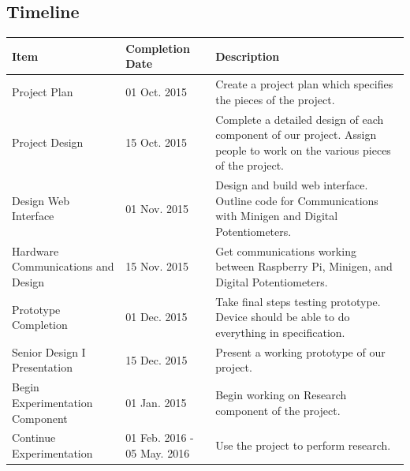 \documentclass{article}	%
\begin{document}
\subsection{Timeline}
\begin{center}
    \begin{tabularx}{\textwidth}{|X|X|X|}
        \hline
        
        \textbf{Item} & 
        \textbf{Completion Date} & 
        \textbf{Description} \\
        \hline

        Project Plan & 
        01 Oct. 2015 & 
        \multicolumn{1}{|p{12cm}|}{\centering 
        Create a project plan which specifies the pieces of the project.
        } \\
        \hline

        Project Design & 
        15 Oct. 2015 & 
        \multicolumn{1}{|p{12cm}|}{\centering 
        Complete a detailed design of each component of our project. Assign people to work on the various pieces of the project.
        } \\
        \hline

        Design Web Interface & 
        01 Nov. 2015 & 
        \multicolumn{1}{|p{12cm}|}{\centering 
        Design and build web interface.
        Outline code for Communications with Minigen and Digital Potentiometers.
        } \\
        \hline

        Hardware Communications and Design & 
        15 Nov. 2015 & 
        \multicolumn{1}{|p{12cm}|}{\centering 
        Get communications working between Raspberry Pi, Minigen, and Digital Potentiometers.
        } \\
        \hline

        Prototype Completion & 
        01 Dec. 2015 & 
        \multicolumn{1}{|p{12cm}|}{\centering 
        Take final steps testing prototype. Device should be able to do everything in specification.
        } \\
        \hline

        Senior Design I Presentation & 
        15 Dec. 2015 & 
        \multicolumn{1}{|p{12cm}|}{\centering 
        Present a working prototype of our project.
        } \\
        \hline

        Begin Experimentation Component & 
        01 Jan. 2015 & 
        \multicolumn{1}{|p{12cm}|}{\centering 
        Begin working on Research component of the project.
        } \\
        \hline

        Continue Experimentation & 
        01 Feb. 2016 - 05 May. 2016 & 
        \multicolumn{1}{|p{12cm}|}{\centering 
        Use the project to perform research.
        } \\
        \hline
    \end{tabularx}
\end{center}
\end{document}
